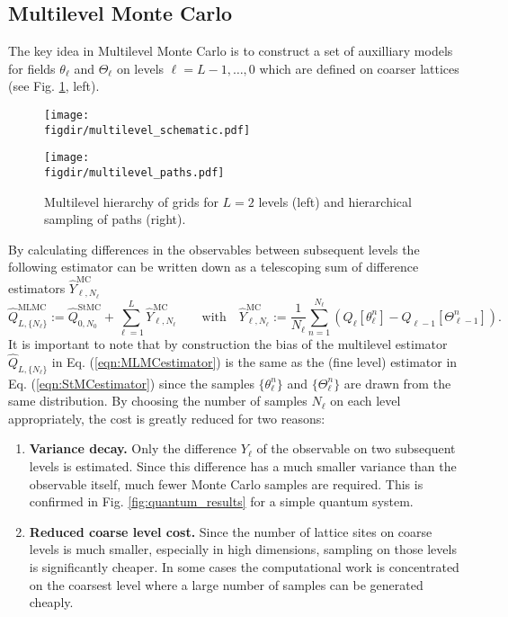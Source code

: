 \documentclass[11pt]{article}
\newcommand{\figdir}{./figures/}
\begin{document}
\subsection{Multilevel Monte Carlo}
The key idea in Multilevel Monte Carlo is to construct a set of auxilliary models for fields $\theta_\ell$ and $\Theta_\ell$ on levels $\ell=L-1,\dots,0$ which are defined on coarser lattices (see Fig. \ref{fig:multilevel}, left).
\begin{figure}
  \begin{center}
  \begin{minipage}{0.55\linewidth}
    \texttt{[image: \\figdir/multilevel\_schematic.pdf]}
  \end{minipage}
  \hfill
  \begin{minipage}{0.4\linewidth}
    \texttt{[image: \\figdir/multilevel\_paths.pdf]}
  \end{minipage}
  \caption{Multilevel hierarchy of grids for $L=2$ levels (left) and hierarchical sampling of paths (right).}\label{fig:multilevel}
  \end{center}
\end{figure}
By calculating differences in the observables between subsequent levels the following estimator can be written down as a telescoping sum of difference estimators $\hat{Y}^{\text{MC}}_{\ell,N_\ell}$
\begin{equation}
  \hat{Q}_{L,\{N_\ell\}}^{\text{MLMC}} := \hat{Q}_{0,N_0}^{\text{StMC}} + \sum_{\ell=1}^L \hat{Y}_{\ell,N_\ell}^{\text{MC}}\qquad\text{with}\quad
  \hat{Y}_{\ell,N_\ell}^{\text{MC}} :=  \frac{1}{N_\ell}\sum_{n=1}^{N_\ell} \left(Q_\ell[\theta_\ell^n] - Q_{\ell-1}[\Theta_{\ell-1}^n]\right).\label{eqn:MLMCestimator}
\end{equation}
It is important to note that by construction the bias of the multilevel estimator $\hat{Q}_{L,\{N_\ell\}}$ in Eq. (\ref{eqn:MLMCestimator}) is the same as the (fine level) estimator in Eq. (\ref{eqn:StMCestimator}) since the samples $\{\theta_\ell^n\}$ and $\{\Theta_\ell^n\}$ are drawn from the same distribution. By choosing the number of samples $N_\ell$ on each level appropriately, the cost is greatly reduced for two reasons:
\begin{enumerate}
\item \textbf{Variance decay.} Only the difference $Y_\ell$ of the observable on two subsequent levels is estimated. Since this difference has a much smaller variance than the observable itself, much fewer Monte Carlo samples are required. This is confirmed in Fig. \ref{fig:quantum_results} for a simple quantum system.
  \item \textbf{Reduced coarse level cost.} Since the number of lattice sites on coarse levels is much smaller, especially in high dimensions, sampling on those levels is significantly cheaper. In some cases the computational work is concentrated on the coarsest level where a large number of samples can be generated cheaply.
\end{enumerate}
\end{document}

